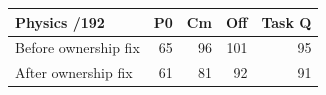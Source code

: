 \begin{tabular}{lrrrr}
\toprule
Physics /192 & P0 & Cm & Off & Task Q\\
\midrule
Before ownership fix & 65 & 96 & 101 & 95\\
After ownership fix & 61 & 81 & 92 & 91\\
\bottomrule
\end{tabular}
